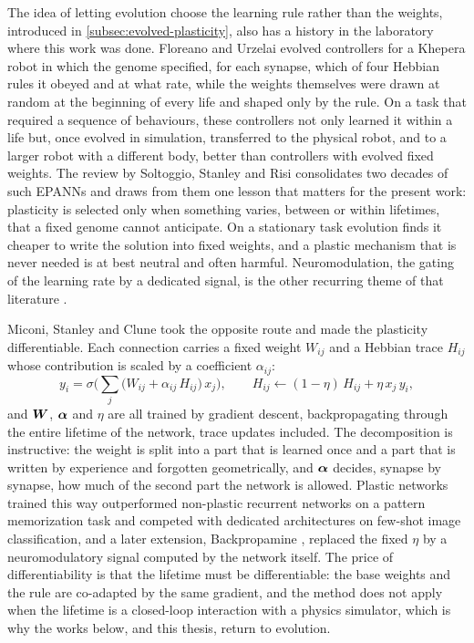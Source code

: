 The idea of letting evolution choose the learning rule rather than the weights, introduced in \autoref{subsec:evolved-plasticity}, also has a history in the laboratory where this work was done. Floreano and Urzelai \cite{floreano2000evolutionary} evolved controllers for a Khepera robot in which the genome specified, for each synapse, which of four Hebbian rules it obeyed and at what rate, while the weights themselves were drawn at random at the beginning of every life and shaped only by the rule. On a task that required a sequence of behaviours, these controllers not only learned it within a life but, once evolved in simulation, transferred to the physical robot, and to a larger robot with a different body, better than controllers with evolved fixed weights. The review by Soltoggio, Stanley and Risi \cite{soltoggio2018born} consolidates two decades of such EPANNs and draws from them one lesson that matters for the present work: plasticity is selected only when something varies, between or within lifetimes, that a fixed genome cannot anticipate. On a stationary task evolution finds it cheaper to write the solution into fixed weights, and a plastic mechanism that is never needed is at best neutral and often harmful. Neuromodulation, the gating of the learning rate by a dedicated signal, is the other recurring theme of that literature \cite{soltoggio2008evolutionary}.

Miconi, Stanley and Clune \cite{miconi2018differentiable} took the opposite route and made the plasticity differentiable. Each connection carries a fixed weight $W_{ij}$ and a Hebbian trace $H_{ij}$ whose contribution is scaled by a coefficient $\alpha_{ij}$:
\begin{equation}
y_i = \sigma\Big( \sum_j \big( W_{ij} + \alpha_{ij}\, H_{ij} \big)\, x_j \Big), \qquad H_{ij} \leftarrow (1-\eta)\, H_{ij} + \eta\, x_j\, y_i,
\label{eq:diffplast}
\end{equation}
and $\bm{W}$, $\bm{\alpha}$ and $\eta$ are all trained by gradient descent, backpropagating through the entire lifetime of the network, trace updates included. The decomposition is instructive: the weight is split into a part that is learned once and a part that is written by experience and forgotten geometrically, and $\bm{\alpha}$ decides, synapse by synapse, how much of the second part the network is allowed. Plastic networks trained this way outperformed non-plastic recurrent networks on a pattern memorization task and competed with dedicated architectures on few-shot image classification, and a later extension, Backpropamine \cite{miconi2019backpropamine}, replaced the fixed $\eta$ by a neuromodulatory signal computed by the network itself. The price of differentiability is that the lifetime must be differentiable: the base weights and the rule are co-adapted by the same gradient, and the method does not apply when the lifetime is a closed-loop interaction with a physics simulator, which is why the works below, and this thesis, return to evolution.

